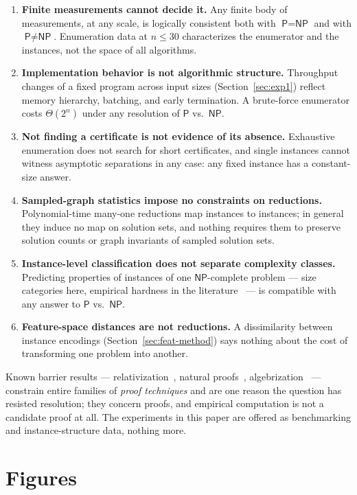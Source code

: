 \documentclass[11pt]{article}
\newcommand{\NP}{\textsf{NP}}
\newcommand{\PTIME}{\textsf{P}}
\begin{document}
\begin{enumerate}
\item \textbf{Finite measurements cannot decide it.} Any finite body of measurements, at any scale, is logically consistent both with $\PTIME = \NP$ and with $\PTIME \neq \NP$. Enumeration data at $n \leq 30$ characterizes the enumerator and the instances, not the space of all algorithms.
\item \textbf{Implementation behavior is not algorithmic structure.} Throughput changes of a fixed program across input sizes (Section~\ref{sec:exp1}) reflect memory hierarchy, batching, and early termination. A brute-force enumerator costs $\Theta(2^n)$ under any resolution of $\PTIME$ vs.\ $\NP$.
\item \textbf{Not finding a certificate is not evidence of its absence.} Exhaustive enumeration does not search for short certificates, and single instances cannot witness asymptotic separations in any case: any fixed instance has a constant-size answer.
\item \textbf{Sampled-graph statistics impose no constraints on reductions.} Polynomial-time many-one reductions map instances to instances; in general they induce no map on solution sets, and nothing requires them to preserve solution counts or graph invariants of sampled solution sets.
\item \textbf{Instance-level classification does not separate complexity classes.} Predicting properties of instances of one $\NP$-complete problem --- size categories here, empirical hardness in the literature~\cite{SATzilla} --- is compatible with any answer to $\PTIME$ vs.\ $\NP$.
\item \textbf{Feature-space distances are not reductions.} A dissimilarity between instance encodings (Section~\ref{sec:feat-method}) says nothing about the cost of transforming one problem into another.
\end{enumerate}

Known barrier results --- relativization~\cite{BGS1975}, natural proofs~\cite{RR1997}, algebrization~\cite{AW2009} --- constrain entire families of \emph{proof techniques} and are one reason the question has resisted resolution; they concern proofs, and empirical computation is not a candidate proof at all. The experiments in this paper are offered as benchmarking and instance-structure data, nothing more.

\section{Figures}
\end{document}
